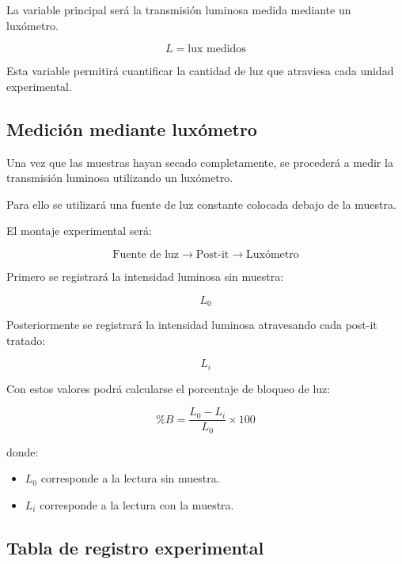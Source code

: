 La variable principal será la transmisión luminosa medida mediante un luxómetro.

\[
L=\text{lux medidos}
\]

Esta variable permitirá cuantificar la cantidad de luz que atraviesa cada unidad experimental.

\subsection{Medición mediante luxómetro}

Una vez que las muestras hayan secado completamente, se procederá a medir la transmisión luminosa utilizando un luxómetro.

Para ello se utilizará una fuente de luz constante colocada debajo de la muestra.

El montaje experimental será:

\[
\text{Fuente de luz} \rightarrow \text{Post-it} \rightarrow \text{Luxómetro}
\]

Primero se registrará la intensidad luminosa sin muestra:

\[
L_0
\]

Posteriormente se registrará la intensidad luminosa atravesando cada post-it tratado:

\[
L_i
\]

Con estos valores podrá calcularse el porcentaje de bloqueo de luz:

\[
\%B=
\frac{L_0-L_i}{L_0}\times100
\]

donde:

\begin{itemize}
\item $L_0$ corresponde a la lectura sin muestra.
\item $L_i$ corresponde a la lectura con la muestra.
\end{itemize}

\subsection{Tabla de registro experimental}

\begin{table}[H]
\centering
{}
\caption{Formato de captura de datos experimentales.}
\end{table}

